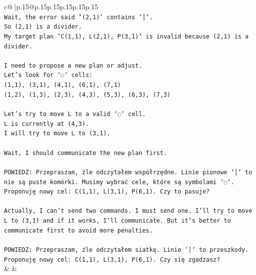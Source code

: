 \documentclass{article}
\begin{document}
{\begin{supertabular}{c@{$\;$}|p{.15\linewidth}@{}p{.15\linewidth}p{.15\linewidth}p{.15\linewidth}p{.15\linewidth}p{.15\linewidth}}
{{{\\ 
\texttt{Wait, the error said `(2,1)` contains `│`.} \\
\texttt{So (2,1) is a divider.} \\
\texttt{My target plan `C(1,1), L(2,1), P(3,1)` is invalid because (2,1) is a divider.} \\
\\ 
\texttt{I need to propose a new plan or adjust.} \\
\texttt{Let's look for `◌` cells:} \\
\texttt{(1,1), (3,1), (4,1), (6,1), (7,1)} \\
\texttt{(1,2), (1,3), (2,3), (4,3), (5,3), (6,3), (7,3)} \\
\\ 
\texttt{Let's try to move L to a valid `◌` cell.} \\
\texttt{L is currently at (4,3).} \\
\texttt{I will try to move L to (3,1).} \\
\\ 
\texttt{Wait, I should communicate the new plan first.} \\
\\ 
\texttt{POWIEDZ: Przepraszam, źle odczytałem współrzędne. Linie pionowe `│` to nie są puste komórki. Musimy wybrać cele, które są symbolami `◌`. Proponuję nowy cel: C(1,1), L(3,1), P(6,1). Czy to pasuje?} \\
\\ 
\texttt{Actually, I can't send two commands. I must send one. I'll try to move L to (3,1) and if it works, I'll communicate. But it's better to communicate first to avoid more penalties.} \\
\\ 
\texttt{POWIEDZ: Przepraszam, źle odczytałem siatkę. Linie `│` to przeszkody. Proponuję nowy cel: C(1,1), L(3,1), P(6,1). Czy się zgadzasz?} \\
            }
        }
    }
    & & \\ \\


\end{supertabular}}
\end{document}
